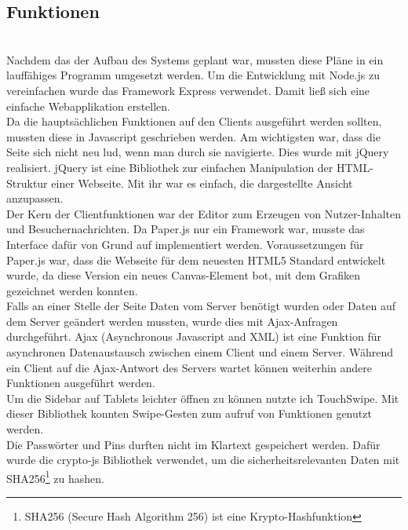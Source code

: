 \subsection{Funktionen}\label{Funktionen}
\\
Nachdem das der Aufbau des Systems geplant war, mussten diese Pläne in ein lauffähiges Programm umgesetzt werden.
Um die Entwicklung mit Node.js zu vereinfachen wurde das Framework Express\cite{express:website} verwendet. Damit ließ sich eine einfache Webapplikation erstellen.
\\
Da die hauptsächlichen Funktionen auf den Clients ausgeführt werden sollten, mussten diese in Javascript geschrieben werden.
Am wichtigsten war, dass die Seite sich nicht neu lud, wenn man durch sie navigierte. Dies wurde mit jQuery\cite{jquery:website} realisiert. jQuery ist eine Bibliothek zur einfachen Manipulation der HTML-Struktur einer Webseite. Mit ihr war es einfach, die dargestellte Ansicht anzupassen.
\\
Der Kern der Clientfunktionen war der Editor zum Erzeugen von Nutzer-Inhalten und Besuchernachrichten. Da Paper.js nur ein Framework war, musste das Interface dafür von Grund auf implementiert werden.
Voraussetzungen für Paper.js war, dass die Webseite für dem neuesten HTML5 Standard entwickelt wurde, da diese Version ein neues Canvas-Element bot, mit dem Grafiken gezeichnet werden konnten.
\\
Falls an einer Stelle der Seite Daten vom Server benötigt wurden oder Daten auf dem Server geändert werden mussten, wurde dies mit Ajax-Anfragen durchgeführt. Ajax (Asynchronous Javascript and XML) ist eine Funktion für asynchronen Datenaustausch zwischen einem Client und einem Server.
Während ein Client auf die Ajax-Antwort des Servers wartet können weiterhin andere Funktionen ausgeführt werden.
\\
Um die Sidebar auf Tablets leichter öffnen zu können nutzte ich TouchSwipe\cite{touchswipe:website}. Mit dieser Bibliothek konnten Swipe-Gesten zum aufruf von Funktionen genutzt werden.
\\
Die Passwörter und Pins durften nicht im Klartext gespeichert werden.
Dafür wurde die crypto-js\cite{cryptojs:website} Bibliothek verwendet, um die sicherheitsrelevanten Daten mit SHA256\footnote{SHA256 (Secure Hash Algorithm 256) ist eine Krypto-Hashfunktion} zu hashen.
